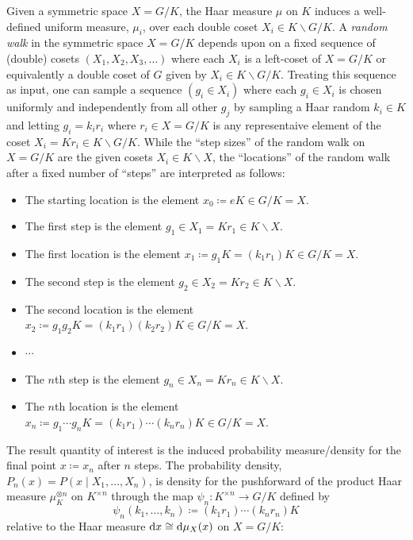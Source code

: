 \documentclass[notitlepage]{article}
\begin{document}
Given a symmetric space $X = G/K$, the Haar measure $\mu$ on $K$ induces a well-defined uniform measure, $\mu_i$, over each double coset $X_i \in K \backslash G / K$.
A \textit{random walk} in the symmetric space $X = G/K$ depends upon on a fixed sequence of (double) cosets $(X_1, X_2, X_3, \ldots)$ where each $X_i$ is a left-coset of $X = G/K$ or equivalently a double coset of $G$ given by $X_i \in K \backslash G / K$.
Treating this sequence as input, one can sample a sequence $(g_i \in X_i)$ where each $g_i \in X_i$ is chosen uniformly and independently from all other $g_j$ by sampling a Haar random $k_i \in K$ and letting $g_i = k_i r_i$ where $r_i \in X = G/K$ is any representaive element of the coset $X_i = Kr_i \in K \backslash G/K$.
While the ``step sizes'' of the random walk on $X = G/K$ are the given cosets $X_i \in K \backslash X$, the ``locations'' of the random walk after a fixed number of ``steps'' are interpreted as follows: 
\begin{itemize}
    \item The starting location is the element $x_0 \coloneqq e K \in G/K = X$.
    \item The first step is the element $g_1 \in X_1 = K r_1 \in K\backslash X$.
    \item The first location is the element $x_1 \coloneqq g_1 K = (k_1 r_1) K \in G/K = X$.
    \item The second step is the element $g_2 \in X_2 = K r_2 \in K\backslash X$.
    \item The second location is the element $x_2 \coloneqq g_1 g_2 K = (k_1 r_1)(k_2 r_2) K \in G/K = X$.
    \item $\cdots$
    \item The $n$th step is the element $g_n \in X_n = K r_n \in K\backslash X$.
    \item The $n$th location is the element $x_n \coloneqq g_1 \cdots g_n K = (k_1 r_1)\cdots (k_n r_n) K \in G/K = X$.
\end{itemize}

The result quantity of interest is the induced probability measure/density for the final point $x \coloneqq x_n$ after $n$ steps. 
The probability density, $P_n(x) = P(x \mid X_1, \ldots, X_n)$, is density for the pushforward of the product Haar measure $\mu_K^{\otimes n}$ on $K^{\times n}$ through the map $\psi_n : K^{\times n} \to G/K$ defined by
\begin{equation}
    \label{eq:n_step_process}
    \psi_n(k_1, \ldots, k_n) \coloneqq (k_1 r_1)\cdots (k_n r_n)K
\end{equation}
relative to the Haar measure $\mathrm{d} x \cong \mathrm{d} \mu_X(x)$ on $X = G/K$:
\end{document}
